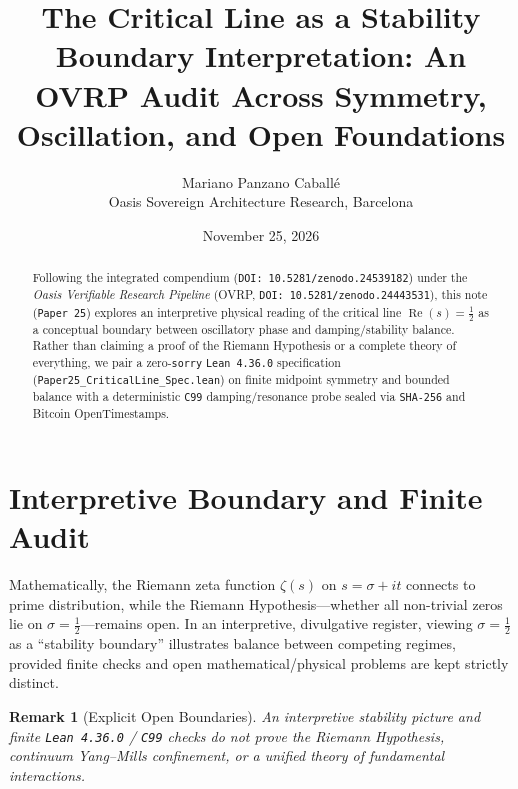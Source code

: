 \documentclass[11pt,a4paper]{article}
\title{The Critical Line as a Stability Boundary Interpretation: An OVRP Audit Across Symmetry, Oscillation, and Open Foundations}
\author{Mariano Panzano Caball\'e \\ \small Oasis Sovereign Architecture Research, Barcelona}
\date{November 25, 2026}
\newtheorem{remark}{Remark}
\begin{document}
\maketitle

\begin{abstract}
Following the integrated compendium (\texttt{DOI: 10.5281/zenodo.24539182}) under the \emph{Oasis Verifiable Research Pipeline} (OVRP, \texttt{DOI: 10.5281/zenodo.24443531}), this note (\texttt{Paper~25}) explores an interpretive physical reading of the critical line $\operatorname{Re}(s) = \tfrac{1}{2}$ as a conceptual boundary between oscillatory phase and damping/stability balance. Rather than claiming a proof of the Riemann Hypothesis or a complete theory of everything, we pair a zero-\texttt{sorry} \texttt{Lean~4.36.0} specification (\texttt{Paper25\_CriticalLine\_Spec.lean}) on finite midpoint symmetry and bounded balance with a deterministic \texttt{C99} damping/resonance probe sealed via \texttt{SHA-256} and Bitcoin OpenTimestamps.
\end{abstract}

\section{Interpretive Boundary and Finite Audit}
Mathematically, the Riemann zeta function $\zeta(s)$ on $s = \sigma + it$ connects to prime distribution, while the Riemann Hypothesis---whether all non-trivial zeros lie on $\sigma = \tfrac{1}{2}$---remains open. In an interpretive, divulgative register, viewing $\sigma = \tfrac{1}{2}$ as a ``stability boundary'' illustrates balance between competing regimes, provided finite checks and open mathematical/physical problems are kept strictly distinct.

\begin{remark}[Explicit Open Boundaries]
An interpretive stability picture and finite \texttt{Lean~4.36.0} / \texttt{C99} checks do not prove the Riemann Hypothesis, continuum Yang--Mills confinement, or a unified theory of fundamental interactions.
\end{remark}
\end{document}
